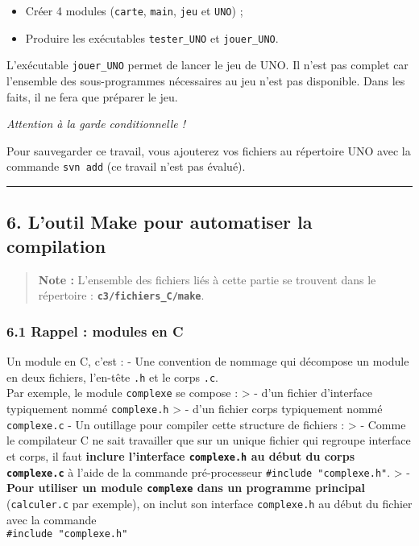 \documentclass[11pt]{article}
\providecommand{\tightlist}{%
      \setlength{\itemsep}{0pt}\setlength{\parskip}{0pt}}
\begin{document}
\begin{itemize}
\tightlist
\item
  Créer 4 modules (\texttt{carte}, \texttt{main}, \texttt{jeu} et
  \texttt{UNO}) ;
\item
  Produire les exécutables \texttt{tester\_UNO} et \texttt{jouer\_UNO}.
\end{itemize}

L'exécutable \texttt{jouer\_UNO} permet de lancer le jeu de UNO. Il
n'est pas complet car l'ensemble des sous-programmes nécessaires au jeu
n'est pas disponible. Dans les faits, il ne fera que préparer le jeu.

\emph{Attention à la garde conditionnelle !}

Pour sauvegarder ce travail, vous ajouterez vos fichiers au répertoire
UNO avec la commande \texttt{svn\ add} (ce travail n'est pas évalué).

    \begin{center}\rule{0.5\linewidth}{\linethickness}\end{center}

    \subsection{6. L'outil Make pour automatiser la
compilation}\label{loutil-make-pour-automatiser-la-compilation}

\begin{quote}
\textbf{Note :} L'ensemble des fichiers liés à cette partie se trouvent
dans le répertoire : \textbf{\texttt{c3/fichiers\_C/make}}.
\end{quote}

    \subsubsection{6.1 Rappel : modules en C}\label{rappel-modules-en-c}

Un module en C, c'est : - Une convention de nommage qui décompose un
module en deux fichiers, l'en-tête \texttt{.h} et le corps
\texttt{.c}.\\
Par exemple, le module \texttt{complexe} se compose : \textgreater{} -
d'un fichier d'interface typiquement nommé \texttt{complexe.h}
\textgreater{} - d'un fichier corps typiquement nommé
\texttt{complexe.c} - Un outillage pour compiler cette structure de
fichiers : \textgreater{} - Comme le compilateur C ne sait travailler
que sur un unique fichier qui regroupe interface et corps, il faut
\textbf{inclure l'interface \texttt{complexe.h} au début du corps
\texttt{complexe.c}} à l'aide de la commande pré-processeur
\texttt{\#include\ "complexe.h"}. \textgreater{} - \textbf{Pour utiliser
un module \texttt{complexe} dans un programme principal}
(\texttt{calculer.c} par exemple), on inclut son interface
\texttt{complexe.h} au début du fichier avec la commande\\
\texttt{\#include\ "complexe.h"}
\end{document}

